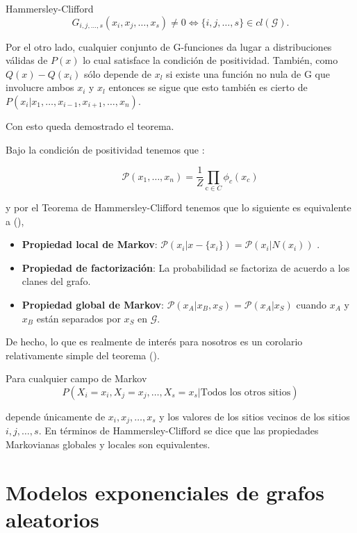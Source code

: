 \begin{theorem}{Hammersley-Clifford}
    $$G_{i,j,\ldots,s}(x_i,x_j,\ldots,x_s) \neq 0 \iff \{i,j,\ldots,s\} \in cl(\mathcal{G}).$$
    
    Por el otro lado, cualquier conjunto de G-funciones da lugar a distribuciones válidas de $P(x)$ lo cual satisface la condición de positividad. También, como $Q(x)-Q(x_i)$ sólo depende de $x_l$ si existe una función no nula de G que involucre ambos $x_i$ y $x_l$ entonces se sigue que esto también es cierto de $P(x_i|x_1,\dots,x_{i-1},x_{i+1},\dots,x_n)$.
    
    Con esto queda demostrado el teorema.

\end{theorem}

Bajo la condición de positividad tenemos que : 

$${ \qquad \mathcal{P} \left( x _ { 1 } , \ldots , x _ { n } \right) = \frac { 1 } { Z } \prod _ { \mathrm { c } \in C } \phi _ { c } \left( x _ { c } \right) } $$

y por el Teorema de Hammersley-Clifford tenemos que lo siguiente es equivalente a (\cite{HCTheoremImpact}), 

\begin{itemize}
    \item \textbf{Propiedad local de Markov}: $\mathcal{P}(x_i|x-\{x_i\}) = \mathcal{P}(x_i|N(x_i))$ .
    \item \textbf{Propiedad de factorización}: La probabilidad se factoriza de acuerdo a los clanes del grafo.
    \item \textbf{Propiedad global de Markov}: $\mathcal{P}(x_A|x_B,x_S) = \mathcal{P}(x_A|x_S)$ cuando $x_A$ y $x_B$ están separados por $x_S$ en $\mathcal{G}$.
\end{itemize}

De hecho, lo que es realmente de interés para nosotros es un corolario relativamente simple del teorema (\cite{MonteCarloMethods}).

\begin{corollary}
    Para cualquier campo de Markov\\
    $$P(X_i = x_i, X_j = x_j, \dots, X_s = x_s| \text{Todos los otros sitios} )$$
    
    depende únicamente de $x_i,x_j,\dots,x_s$ y los valores de los sitios vecinos de los sitios $i,j,\dots,s$. En términos de Hammersley-Clifford se dice que las propiedades Markovianas globales y locales son equivalentes.
\end{corollary}

\section{Modelos exponenciales de grafos aleatorios}


